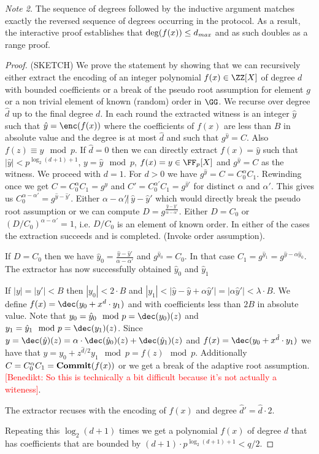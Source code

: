 \documentclass{article}
\theoremstyle{definition}
\newcommand{\benedikt}[1]{{\textcolor{red}{[Benedikt: #1]}}}
\newcommand{\benedikt}[1]{}
\begin{document}
{\it Note 2.} The sequence of degrees followed by the inductive argument matches exactly the reversed sequence of degrees occurring in the protocol. As a result, the interactive proof establishes that $\deg(f(x)) \leq d_{\it max}$ and as such doubles as a range proof.

\begin{proof}
(SKETCH)
We prove the statement by showing that we can recursively either extract the encoding of an integer polynomial $f(x) \in \ZZ[X]$ of degree $d$ with bounded coefficients or a break of the pseudo root assumption for element $g$ or a non trivial element of known (random) order in $\GG$. We recurse over degree $\hat{d}$ up to the final degree $d$.
In each round the extracted witness is an integer $\hat{y}$ such that $\hat{y}=\enc(f(x))$ where the coefficients of $f(x)$ are less than $B$ in absolute value and the degree is at most $\hat{d}$ and such that $g^{\hat{y}}=C$. Also $f(z) \equiv y \mod p$.
If $\hat{d}=0$ then we can directly extract $f(x)=\hat{y}$ such that $\vert \hat{y} \vert < p^{\log_2(d+1)+1}$, $y=\hat{y}\mod p$, $f(x)=y\in \FF_p[X]$ and $g^{\hat{y}}=C$ as the witness. We proceed with $d=1$.
For $d>0$ we have $g^{\hat{y}}=C=C_0^{\alpha}C_1$. Rewinding once we get 
 $C=C_0^{\alpha}C_1=g^{\hat{y}}$ and $C'=C_0^{\alpha'}C_1=g^{\hat{y}'}$ for distinct $\alpha$ and $\alpha'$. 
 This gives us $C_0^{\alpha-\alpha'}=g^{\hat{y}-\hat{y}'}$. 
 Either $\alpha-\alpha' \not|~ \hat{y}-\hat{y}' $ which would directly break the pseudo root assumption or we can compute $D=g^{\frac{\hat{y}-\hat{y}'}{\alpha-\alpha'}}$. Either $D=C_0$ or $(D/C_0)^{\alpha-\alpha'}=1$, i.e. $D/C_0$ is an element of known order. In either of the cases the extraction succeeds and is completed. (Invoke order assumption).
 
 If $D=C_0$ then we have $\hat{y}_0=\frac{\hat{y}-\hat{y}'}{\alpha-\alpha'}$ and
 $g^{\hat{y}_0}=C_0$. In that case $C_1=g^{\hat{y}_1}=g^{\hat{y}-\alpha\hat{y}_0}$. The extractor has now successfully obtained $\hat{y}_0$ and $\hat{y}_1$
 
 If $|y|=|y'|<B$ then $|y_0|<  2 \cdot B$ and $|y_1|<|\hat{y}-\hat{y}+\alpha\hat{y}'|=|\alpha \hat{y}'|<\lambda \cdot B$. 
 We define $f(x)=\dec(y_0+x^{d} \cdot y_1)$ and with coefficients less than $2B$ in absolute value. 
 Note that $y_0=\hat{y}_0 \mod p=\dec(y_0)(z)$ and $y_1=\hat{y}_1 \mod p=\dec(y_1)(z)$. Since $y=\dec(\hat{y})(z)=\alpha \cdot \dec(\hat{y}_0)(z)+\dec(\hat{y}_1)(z)$ and $f(x)=\dec(y_0+x^{\hat{d}} \cdot y_1)$ we have that $y=y_0 +z^{\hat{d}/2}y_1 \mod p=f(z) \mod p$.
 Additionally $C=C_0^{\alpha}C_1=\textbf{{Commit}}(f(x))$ or we get a break of the adaptive root assumption.\benedikt{So this is technically a bit difficult because it's not actually a witeness}.
 
 The extractor recuses with the encoding of $f(x)$ and degree $\hat{d}'=\hat{d}\cdot 2$.
 
 Repeating this $\log_2(d+1)$ times we get a polynomial $f(x)$ of degree $d$ that has coefficients that are bounded by $(d+1) \cdot p^{\log_2(d+1)+1} <q/2$. 

\end{proof}
\end{document}
